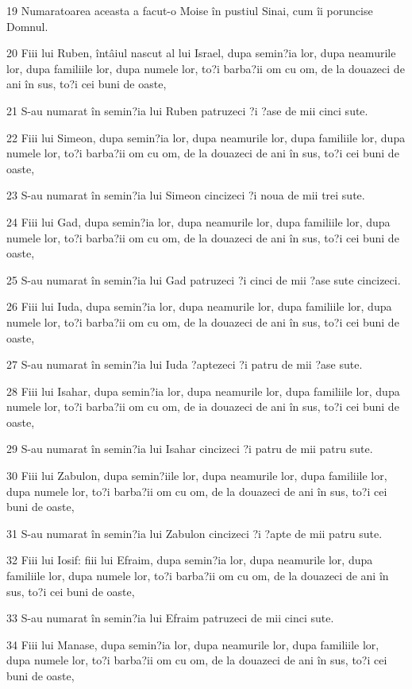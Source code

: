 \par 19 Numaratoarea aceasta a facut-o Moise în pustiul Sinai, cum îi poruncise Domnul.
\par 20 Fiii lui Ruben, întâiul nascut al lui Israel, dupa semin?ia lor, dupa neamurile lor, dupa familiile lor, dupa numele lor, to?i barba?ii om cu om, de la douazeci de ani în sus, to?i cei buni de oaste,
\par 21 S-au numarat în semin?ia lui Ruben patruzeci ?i ?ase de mii cinci sute.
\par 22 Fiii lui Simeon, dupa semin?ia lor, dupa neamurile lor, dupa familiile lor, dupa numele lor, to?i barba?ii om cu om, de la douazeci de ani în sus, to?i cei buni de oaste,
\par 23 S-au numarat în semin?ia lui Simeon cincizeci ?i noua de mii trei sute.
\par 24 Fiii lui Gad, dupa semin?ia lor, dupa neamurile lor, dupa familiile lor, dupa numele lor, to?i barba?ii om cu om, de la douazeci de ani în sus, to?i cei buni de oaste,
\par 25 S-au numarat în semin?ia lui Gad patruzeci ?i cinci de mii ?ase sute cincizeci.
\par 26 Fiii lui Iuda, dupa semin?ia lor, dupa neamurile lor, dupa familiile lor, dupa numele lor, to?i barba?ii om cu om, de la douazeci de ani în sus, to?i cei buni de oaste,
\par 27 S-au numarat în semin?ia lui Iuda ?aptezeci ?i patru de mii ?ase sute.
\par 28 Fiii lui Isahar, dupa semin?ia lor, dupa neamurile lor, dupa familiile lor, dupa numele lor, to?i barba?ii om cu om, de ia douazeci de ani în sus, to?i cei buni de oaste,
\par 29 S-au numarat în semin?ia lui Isahar cincizeci ?i patru de mii patru sute.
\par 30 Fiii lui Zabulon, dupa semin?iile lor, dupa neamurile lor, dupa familiile lor, dupa numele lor, to?i barba?ii om cu om, de la douazeci de ani în sus, to?i cei buni de oaste,
\par 31 S-au numarat în semin?ia lui Zabulon cincizeci ?i ?apte de mii patru sute.
\par 32 Fiii lui Iosif: fiii lui Efraim, dupa semin?ia lor, dupa neamurile lor, dupa familiile lor, dupa numele lor, to?i barba?ii om cu om, de la douazeci de ani în sus, to?i cei buni de oaste,
\par 33 S-au numarat în semin?ia lui Efraim patruzeci de mii cinci sute.
\par 34 Fiii lui Manase, dupa semin?ia lor, dupa neamurile lor, dupa familiile lor, dupa numele lor, to?i barba?ii om cu om, de la douazeci de ani în sus, to?i cei buni de oaste,
